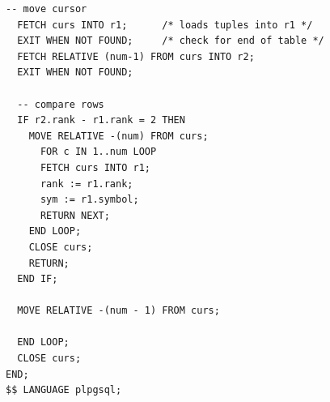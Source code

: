 \documentclass[10pt, landscape]{article}
\begin{document}
\begin{multicols}{3}
\begin{itemize}
\begin{lstlisting}[style=mySQL]
  -- move cursor
  FETCH curs INTO r1;      /* loads tuples into r1 */
  EXIT WHEN NOT FOUND;     /* check for end of table */
  FETCH RELATIVE (num-1) FROM curs INTO r2;
  EXIT WHEN NOT FOUND;

  -- compare rows
  IF r2.rank - r1.rank = 2 THEN
    MOVE RELATIVE -(num) FROM curs;
      FOR c IN 1..num LOOP
      FETCH curs INTO r1;
      rank := r1.rank;
      sym := r1.symbol;
      RETURN NEXT;
    END LOOP;
    CLOSE curs;
    RETURN;
  END IF;

  MOVE RELATIVE -(num - 1) FROM curs;

  END LOOP;
  CLOSE curs;
END;
$$ LANGUAGE plpgsql;
    \end{lstlisting}
  \end{itemize}






\end{multicols}

\hrulefill \\
\end{document}
